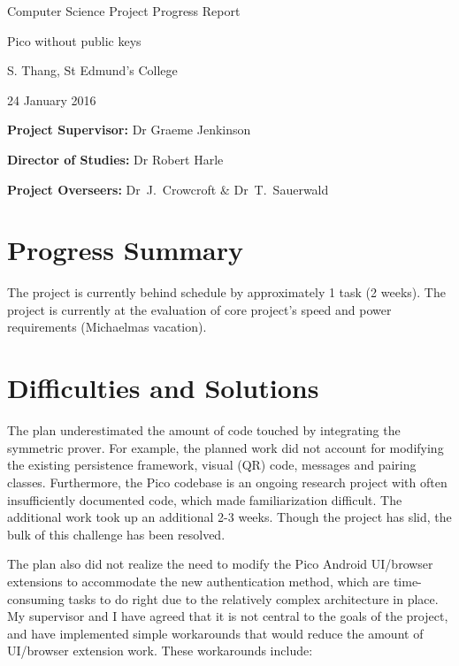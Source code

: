 \documentclass[12pt,a4paper,twoside]{article}
\begin{document}
\vfil

\centerline{\Large Computer Science Project Progress Report}
\vspace{0.4in}
\centerline{\Large Pico without public keys}
\vspace{0.4in}
\centerline{\large S. Thang, St Edmund’s College}
\vspace{0.3in}
\centerline{\large 24 January 2016}

\vfil


\noindent
{\bf Project Supervisor:} Dr Graeme Jenkinson
\vspace{0.2in}

\noindent
{\bf Director of Studies:} Dr Robert Harle
\vspace{0.2in}
\noindent
 
\noindent
{\bf Project Overseers:} Dr~J.~Crowcroft \& Dr~T.~Sauerwald



\section*{Progress Summary}


The project is currently behind schedule by approximately 1 task (2 weeks). The project is currently at the evaluation of core project's speed and power requirements  (Michaelmas vacation).

\section*{Difficulties and Solutions}

The plan underestimated the amount of code touched by integrating the symmetric prover. For example, the planned work did not account for modifying the existing persistence framework, visual (QR) code, messages and pairing classes. Furthermore, the Pico codebase is an ongoing research project with often insufficiently documented code, which made familiarization difficult.  The additional work took up an additional 2-3 weeks. Though the project has slid, the bulk of this challenge has been resolved.

The plan also did not realize the need to modify the Pico Android UI/browser extensions to accommodate the new authentication method, which are time-consuming tasks to do right due to the relatively complex architecture in place. My supervisor and I have agreed that it is not central to the goals of the project, and have implemented simple workarounds that would reduce the amount of UI/browser extension work. These workarounds include: 
\end{document}
